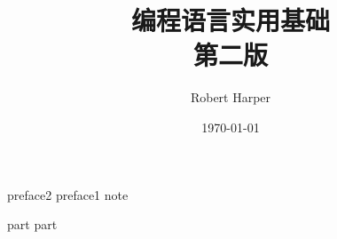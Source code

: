 \documentclass{ctexbook}
\title{{\Huge\textbf{编程语言实用基础}} \\第二版}
\author{Robert Harper}
\date{\today}
\begin{document}
\frontmatter
\maketitle

{preface2}
{preface1}
{note}
\tableofcontents

\newpage
\mainmatter

{part}
{part}

\backmatter
\appendix
\appendixpage
\printglossary[title=术语]
\end{document}
